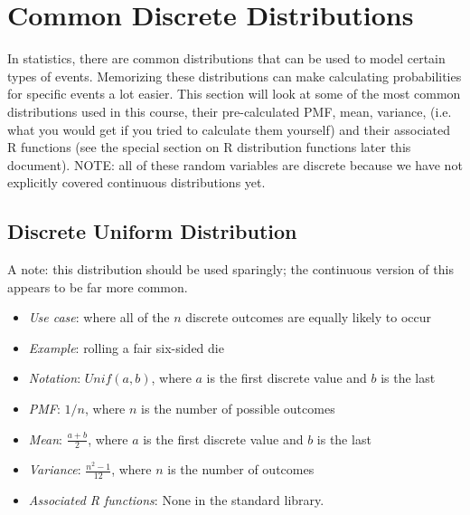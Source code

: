 \documentclass[12pt]{article}
\begin{document}
\section{Common Discrete Distributions}

In statistics, there are common distributions that can be used to model certain
types of events. Memorizing these distributions can make calculating
probabilities for specific events a lot easier. This section will look at some
of the most common distributions used in this course, their pre-calculated PMF,
mean, variance, (i.e. what you would get if you tried to calculate them
yourself) and their associated R functions (see the special section on R
distribution functions later this document). NOTE: all of these random
variables are discrete because we have not explicitly covered continuous
distributions yet.

\subsection{Discrete Uniform Distribution}
A note: this distribution should be used sparingly; the continuous version of
this appears to be far more common.
\begin{itemize}
	\item \textit{Use case}: where all of the $n$ discrete outcomes are equally likely to occur
	\item \textit{Example}: rolling a fair six-sided die
	\item \textit{Notation}: $Unif(a, b)$, where $a$ is the first discrete value and $b$ is the last
	\item \textit{PMF}: $1 / n$, where $n$ is the number of possible outcomes
	\item \textit{Mean}: $\frac{a + b}{2}$, where $a$ is the first discrete value and $b$ is the last
	\item \textit{Variance}: $\frac{n^2 - 1}{12}$, where $n$ is the number of outcomes
	\item \textit{Associated R functions}: None in the standard library.
\end{itemize}
\end{document}
